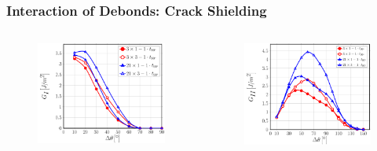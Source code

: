 \documentclass[first,firstsupp,lastsupp,last,hyperref,table]{ETHclass}
\begin{document}
\begin{frame}
\frametitle{\vspace{0.2cm}\small Interaction of Debonds: Crack Shielding}
\vspace{-.75cm}
\centering
\begin{columns}[c]
\centering
\begin{column}{0.5\textwidth}
\centering
\begin{figure}
\centering
\includegraphics[width=\columnwidth]{nxk-1-vf60-GI-crackshield3.pdf}
\end{figure}
\end{column}
\begin{column}{0.5\textwidth}
\centering
\begin{figure}
\centering
\includegraphics[width=\columnwidth]{nxk-1-vf60-GII-crackshield3.pdf}

\end{figure}
\end{column}
\end{columns}
\end{frame}
\end{document}
